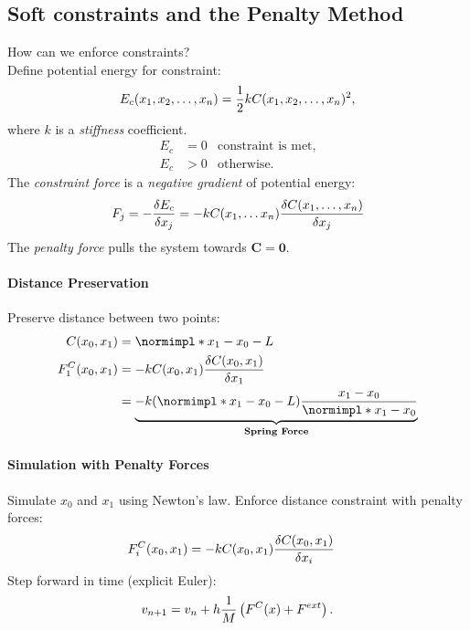 \begin{multicols}{2}
\section{Soft constraints and the Penalty Method}
How can we enforce constraints? \\

Define potential energy for constraint:
\begin{align*}
	E_c(x_1, x_2, \ldots, x_n) = {1 \over 2} kC(x_1, x_2, \ldots, x_n)^2,
\end{align*}
where $k$ is a \emph{stiffness} coefficient.
\begin{align*}
	E_c &= 0 &\text{constraint is met},\\
	E_c &> 0 &\text{otherwise}.
\end{align*}
The \emph{constraint force} is a \emph{negative gradient} of potential energy:
\begin{align*}
	F_j = - {\delta E_c \over \delta x_j} = - kC(x_1, \ldots x_n){\delta C(x_1,\ldots, x_n) \over \delta x_j}
\end{align*}
The \emph{penalty force} pulls the system towards $\mathbf{C=0}$.

\paragraph{Distance Preservation} Preserve distance between two points:
\begin{align*}
	C(x_0, x_1) &= \norm{x_1-x_0}-L\\
	F_1^C(x_0, x_1) &= -kC(x_0, x_1){\delta C(x_0, x_1) \over \delta x_1}\\
		&= \underbrace{-k(\norm{x_1-x_0}-L){x_1-x_0 \over \norm{x_1-x_0}}}_\textbf{Spring Force}
\end{align*}

\paragraph{Simulation with Penalty Forces} Simulate $x_0$ and $x_1$ using Newton's law. Enforce distance constraint with penalty forces:
\begin{align*}
 F_i^C(x_0, x_1) &= -kC(x_0, x_1){\delta C(x_0, x_1) \over \delta x_i}
\end{align*}
Step forward in time (explicit Euler):
\begin{align*}
	v_{n+1} = v_n + h {1 \over M}\left( F^C (x) + F^{ext} \right).
\end{align*}
\end{multicols}

